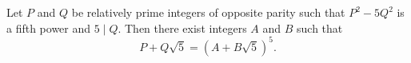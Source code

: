 Let $P$ and $Q$ be relatively prime integers of opposite parity such that $P^2 - 5Q^2$ is a fifth power and $5 \mid Q$. Then there exist integers $A$ and $B$ such that
$$P + Q\sqrt{5} = (A + B\sqrt{5})^5.$$
